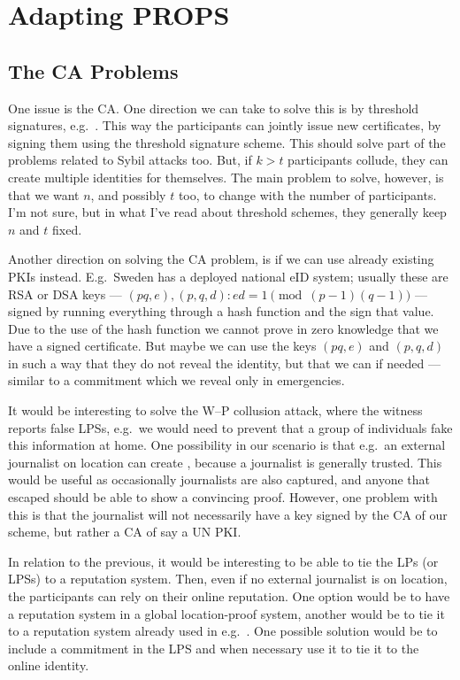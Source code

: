 \section{Adapting PROPS}
\label{AdaptingPROPS}

\subsection{The \acs*{CA} Problems}

One issue is the \ac{CA}.
One direction we can take to solve this is by threshold signatures, e.g.\ 
\cite{FSThresholdSignatures}.
This way the participants can jointly issue new certificates, by signing them 
using the threshold signature scheme.
This should solve part of the problems related to Sybil attacks too.
But, if \(k > t\) participants collude, they can create multiple identities for 
themselves.
The main problem to solve, however, is that we want \(n\), and possibly \(t\) 
too, to change with the number of participants.
I'm not sure, but in what I've read about threshold schemes, they generally 
keep \(n\) and \(t\) fixed.

Another direction on solving the \ac{CA} problem, is if we can use already 
existing \acp{PKI} instead.
E.g.\ Sweden has a deployed national \ac{eID} system; usually these are RSA or 
DSA keys --- \((pq, e), (p, q, d): ed = 1\pmod{(p-1)(q-1)}\) --- signed by 
running everything through a hash function and the sign that value.
Due to the use of the hash function we cannot prove in zero knowledge that we 
have a signed certificate.
But maybe we can use the keys \((pq, e)\) and \((p, q, d)\) in such a way that 
they do not reveal the identity, but that we can if needed --- similar to 
a commitment which we reveal only in emergencies.

It would be interesting to solve the W--P collusion attack, where the witness 
reports false \acp{LPS}, e.g.\ we would need to prevent that a group of 
individuals fake this information at home.
One possibility in our scenario is that e.g.\ an external journalist on 
location can create \iac{LPS}, because a journalist is generally trusted.
This would be useful as occasionally journalists are also captured, and anyone 
that escaped should be able to show a convincing proof.
However, one problem with this is that the journalist will not necessarily have 
a key signed by the \ac{CA} of our scheme, but rather a \ac{CA} of say a UN 
\ac{PKI}.

In relation to the previous, it would be interesting to be able to tie the 
\acp{LP} (or \acp{LPS}) to a reputation system.
Then, even if no external journalist is on location, the participants can rely 
on their online reputation.
One option would be to have a reputation system in a global location-proof 
system, another would be to tie it to a reputation system already used in e.g.\ 
.
One possible solution would be to include a commitment in the \ac{LPS} and when 
necessary use it to tie it to the online identity.

